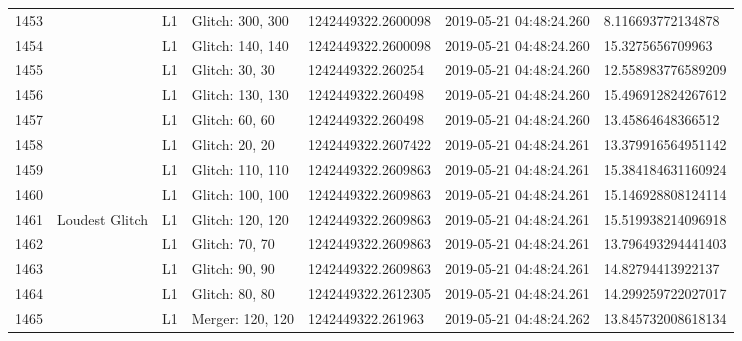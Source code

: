 \begin{longtable}{lllllll}
1453 &                                                    &       L1 &  Glitch: 300, 300 &  1242449322.2600098 &  2019-05-21 04:48:24.260 &   8.116693772134878 \\
1454 &                                                    &       L1 &  Glitch: 140, 140 &  1242449322.2600098 &  2019-05-21 04:48:24.260 &    15.3275656709963 \\
1455 &                                                    &       L1 &    Glitch: 30, 30 &   1242449322.260254 &  2019-05-21 04:48:24.260 &  12.558983776589209 \\
1456 &                                                    &       L1 &  Glitch: 130, 130 &   1242449322.260498 &  2019-05-21 04:48:24.260 &  15.496912824267612 \\
1457 &                                                    &       L1 &    Glitch: 60, 60 &   1242449322.260498 &  2019-05-21 04:48:24.260 &   13.45864648366512 \\
1458 &                                                    &       L1 &    Glitch: 20, 20 &  1242449322.2607422 &  2019-05-21 04:48:24.261 &  13.379916564951142 \\
1459 &                                                    &       L1 &  Glitch: 110, 110 &  1242449322.2609863 &  2019-05-21 04:48:24.261 &  15.384184631160924 \\
1460 &                                                    &       L1 &  Glitch: 100, 100 &  1242449322.2609863 &  2019-05-21 04:48:24.261 &  15.146928808124114 \\
1461 &                                     Loudest Glitch &       L1 &  Glitch: 120, 120 &  1242449322.2609863 &  2019-05-21 04:48:24.261 &  15.519938214096918 \\
1462 &                                                    &       L1 &    Glitch: 70, 70 &  1242449322.2609863 &  2019-05-21 04:48:24.261 &  13.796493294441403 \\
1463 &                                                    &       L1 &    Glitch: 90, 90 &  1242449322.2609863 &  2019-05-21 04:48:24.261 &   14.82794413922137 \\
1464 &                                                    &       L1 &    Glitch: 80, 80 &  1242449322.2612305 &  2019-05-21 04:48:24.261 &  14.299259722027017 \\
1465 &                                                    &       L1 &  Merger: 120, 120 &   1242449322.261963 &  2019-05-21 04:48:24.262 &  13.845732008618134 \\

\end{longtable}
